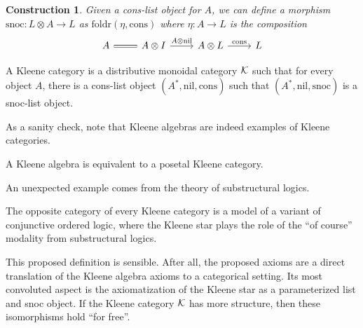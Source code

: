 \documentclass[acmsmall,anonymous,review,screen]{acmart}
\newcommand{\cat}[1]{
  \relax
  \StrLen{#1}[\arglength]
  \ifnum\arglength=1
  \mathcal{#1}
  \else
  \mathbf{#1}
  \fi
}
\newtheorem*{construction}{Construction}
\begin{document}
\begin{construction}
  Given a cons-list object for $A$, we can define a morphism $\textrm{snoc} : L \otimes A \to L$ as $\textrm{foldr}(\eta, \textrm{cons})$
  where $\eta : A \to L$ is the composition
\[\begin{tikzcd}[ampersand replacement=\&]
	A \& {A \otimes I} \& {A \otimes L} \& L
	\arrow[equals, from=1-1, to=1-2]
	\arrow["{A \otimes \textrm{nil}}", from=1-2, to=1-3]
	\arrow["{\textrm{cons}}", from=1-3, to=1-4]
\end{tikzcd}\]
\end{construction}

\begin{definition}
  A Kleene category is a distributive monoidal category $\cat{K}$ such
  that for every object $A$, there is a cons-list object
  $(A^*,\textrm{nil},\textrm{cons})$ such that $(A^*, \textrm{nil},
  \textrm{snoc})$ is a snoc-list object.
\end{definition}

As a sanity check, note that Kleene algebras are indeed examples of
Kleene categories.

\begin{lemma}
  A Kleene algebra is equivalent to a posetal Kleene category.
\end{lemma}

An unexpected example comes from the theory of substructural logics.

\begin{example}
  The opposite category of every Kleene category is a model of a variant of
  conjunctive ordered logic, where the Kleene star plays the role of the ``of
  course'' modality from substructural logics.
\end{example}

This proposed definition is sensible. After all, the proposed axioms
are a direct translation of the Kleene algebra axioms to a categorical
setting. Its most convoluted aspect is the axiomatization of the
Kleene star as a parameterized list and snoc object. If the Kleene
category $\cat{K}$ has more structure, then these isomorphisms hold
``for free''.
\end{document}
